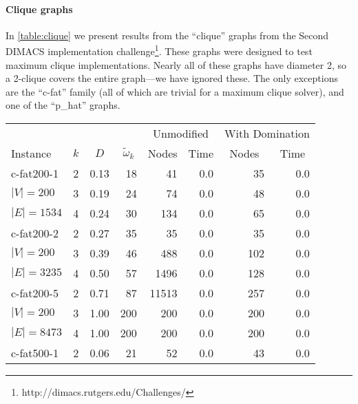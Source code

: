 \documentclass[letterpaper]{article}
\begin{document}
\paragraph{Clique graphs}

In \cref{table:clique} we present results from the ``clique'' graphs from the
Second DIMACS implementation challenge\footnote{http://dimacs.rutgers.edu/Challenges/}. These
graphs were designed to test maximum clique implementations. Nearly all of these graphs have
diameter 2, so a 2-clique covers the entire graph---we have ignored these. The only exceptions are
the ``c-fat'' family (all of which are trivial for a maximum clique solver), and one of the
``p\_hat'' graphs.

\begin{table}
    \scriptsize\setlength{\tabcolsep}{5pt} %
    \centering
    \begin{tabular}{l c rr rr rr}
        \toprule
        & & & & \multicolumn{2}{c}{Unmodified} & \multicolumn{2}{c}{With Domination} \\
    \cmidrule(lr){5-6}
    \cmidrule(lr){7-8}
    Instance & \multicolumn{1}{c}{$k$} & \multicolumn{1}{c}{$D$} & \multicolumn{1}{c}{$\tilde{\omega}_k$} &
    \multicolumn{1}{c}{Nodes} & \multicolumn{1}{c}{Time} &
    \multicolumn{1}{c}{Nodes} & \multicolumn{1}{c}{Time} \\
    \midrule
c-fat200-1  & 2&0.13&18&41&0.0&35&0.0\\
\hspace*{0.2em}\color{gray}$|V|{=}200$& 3&0.19&24&74&0.0&48&0.0\\
\hspace*{0.2em}\color{gray}$|E|{=}1534$& 4&0.24&30&134&0.0&65&0.0\\
c-fat200-2  & 2&0.27&35&35&0.0&35&0.0\\
\hspace*{0.2em}\color{gray}$|V|{=}200$& 3&0.39&46&488&0.0&102&0.0\\
\hspace*{0.2em}\color{gray}$|E|{=}3235$& 4&0.50&57&1496&0.0&128&0.0\\
c-fat200-5  & 2&0.71&87&11513&0.0&257&0.0\\
\hspace*{0.2em}\color{gray}$|V|{=}200$& 3&1.00&200&200&0.0&200&0.0\\
\hspace*{0.2em}\color{gray}$|E|{=}8473$& 4&1.00&200&200&0.0&200&0.0\\
c-fat500-1  & 2&0.06&21&52&0.0&43&0.0\\

\end{tabular}
\end{table}
\end{document}
